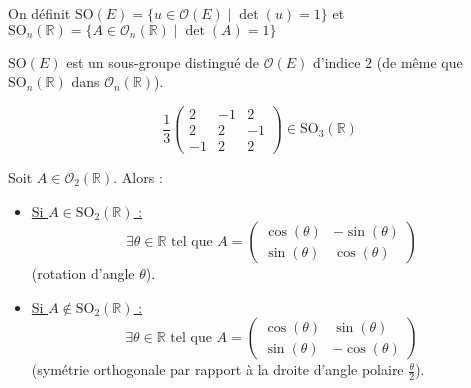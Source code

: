 	
	\begin{definition}
		On définit $\mathrm{SO}(E) = \{ u \in \mathcal{O}(E) \mid \det(u) = 1 \}$ et $\mathrm{SO}_n(\mathbb{R}) = \{ A \in \mathcal{O}_n(\mathbb{R}) \mid \det(A) = 1 \}$
	\end{definition}
	
	
	\begin{proposition}
		$\mathrm{SO}(E)$ est un sous-groupe distingué de $\mathcal{O}(E)$ d'indice $2$ (de même que $\mathrm{SO}_n(\mathbb{R})$ dans $\mathcal{O}_n(\mathbb{R})$).
	\end{proposition}
	
	
	\begin{example}
		\[ \frac{1}{3} \begin{pmatrix} 2 & -1 & 2 \\ 2 & 2 & -1 \\ -1 & 2 & 2 \end{pmatrix} \in \mathrm{SO}_3(\mathbb{R}) \]
	\end{example}
	
	\begin{theorem}
		Soit $A \in \mathcal{O}_2(\mathbb{R})$. Alors :
		\begin{itemize}
			\item \underline{Si $A \in \mathrm{SO}_2(\mathbb{R})$ :}
			\[ \exists \theta \in \mathbb{R} \text{ tel que } A = \begin{pmatrix} \cos(\theta) & -\sin(\theta) \\ \sin(\theta) & \cos(\theta) \end{pmatrix} \]
			(rotation d'angle $\theta$).
			\item \underline{Si $A \notin \mathrm{SO}_2(\mathbb{R})$ :}
			\[ \exists \theta \in \mathbb{R} \text{ tel que } A = \begin{pmatrix} \cos(\theta) & \sin(\theta) \\ \sin(\theta) & -\cos(\theta) \end{pmatrix} \]
			(symétrie orthogonale par rapport à la droite d'angle polaire $\frac{\theta}{2}$).
		\end{itemize}
	\end{theorem}
	
